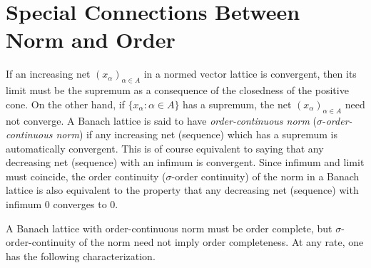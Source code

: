 \section{Special Connections Between Norm and Order}\label{sec:c1-5}%
If an increasing net $ (x_{\alpha})_{\alpha\in A} $ in a normed vector lattice is convergent, then its limit must be the supremum as a consequence of the closedness of the positive cone.
On the other hand, if $ \{x_{\alpha} \colon \alpha \in A\} $ has a supremum, the net $ (x_{\alpha})_{\alpha\in A} $ need not converge.
A Banach lattice is said to have \emph{order-continuous norm} ($ \sigma $-\emph{order-continuous norm}) if any increasing net (sequence) which has a supremum is automatically convergent.
This is of course equivalent to saying that any decreasing net (sequence) with an infimum is convergent.
Since infimum and limit must coincide, the order continuity ($ \sigma $-order continuity) of the norm in a Banach lattice is also equivalent to the property that any decreasing net (sequence) with infimum $ 0 $ converges to $ 0 $.

A Banach lattice with order-continuous norm must be order complete, but $ \sigma $-order-continuity of the norm need not imply order completeness.
At any rate, one has the following characterization.

